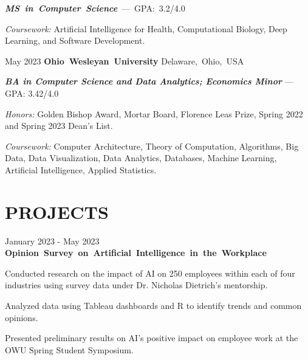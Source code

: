 \documentclass[10pt, letterpaper]{article}
\begin{document}
\vspace{\highlightSpacing}
\mbox{\textit{\textbf{MS in Computer Science}} --- GPA: 3.2/4.0}
\begin{onecolentry}
    \begin{highlights}
        \textit{Coursework:} Artificial Intelligence for Health, Computational Biology, Deep Learning, and Software Development.
    \end{highlights}
\end{onecolentry}

\vspace{\entrySpacing}
\begin{twocolentry}{May 2023}
    \mbox{\textbf{Ohio Wesleyan University}}
    \kern {}
    \AND
    \kern {}
    \mbox{Delaware, Ohio, USA}
\end{twocolentry}

\vspace{\highlightSpacing}
{\textit{\textbf{BA in Computer Science and Data Analytics; Economics Minor}} --- GPA: 3.42/4.0}
\begin{onecolentry}
    \begin{highlights}
        \textit{Honors:} Golden Bishop Award, Mortar Board, Florence Leas Prize, Spring 2022 and Spring 2023 Dean's List.

        \textit{Coursework:} Computer Architecture, Theory of Computation, Algorithms, Big Data, Data Visualization, Data Analytics, Databases, Machine Learning, Artificial Intelligence, Applied Statistics.
    \end{highlights}
\end{onecolentry}

\section{PROJECTS}

\begin{twocolentry}{January 2023 - May 2023}
    \mbox{\textbf{Opinion Survey on Artificial Intelligence in the Workplace}}
\end{twocolentry}

\vspace{\highlightSpacing}
\begin{onecolentry}
    \begin{highlightsforbulletentries}
        \item Conducted research on the impact of AI on 250 employees within each of four industries using survey data under Dr. Nicholas Dietrich's mentorship.
        \item Analyzed data using Tableau dashboards and R to identify trends and common opinions.
        \item Presented preliminary results on AI's positive impact on employee work at the OWU Spring Student Symposium.
    \end{highlightsforbulletentries}
\end{onecolentry}
\end{document}
